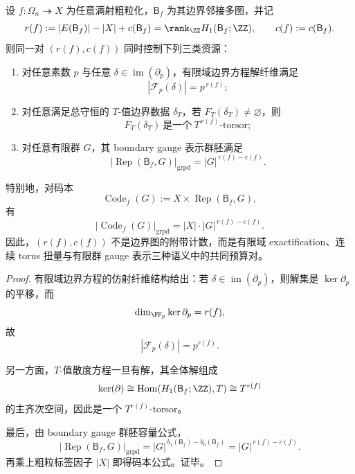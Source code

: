 \begin{theorem}\label{thm:conclusion-boundary-budget-pair-cross-semantic-universality}
设 \(f:\Omega_n\twoheadrightarrow X\) 为任意满射粗粒化，\(\mathsf B_f\) 为其边界邻接多图，并记
\[
r(f):=|E(\mathsf B_f)|-|X|+c(\mathsf B_f)=\rank_{\ZZ}H_1(\mathsf B_f;\ZZ),
\qquad
c(f):=c(\mathsf B_f).
\]
则同一对 \((r(f),c(f))\) 同时控制下列三类资源：
\begin{enumerate}
  \item 对任意素数 \(p\) 与任意 \(\delta\in\operatorname{im}(\partial_p)\)，有限域边界方程解纤维满足
  \[
  |\mathcal F_p(\delta)|=p^{\,r(f)};
  \]
  \item 对任意满足总守恒的 \(T\)-值边界数据 \(\delta_T\)，若 \(F_T(\delta_T)\neq\varnothing\)，则
  \[
  F_T(\delta_T)\ \text{是一个}\ T^{\,r(f)}\text{-torsor};
  \]
  \item 对任意有限群 \(G\)，其 boundary gauge 表示群胚满足
  \[
  |\operatorname{Rep}(\mathsf B_f,G)|_{\mathrm{grpd}}=|G|^{\,r(f)-c(f)}.
  \]
\end{enumerate}
特别地，对码本
\[
\operatorname{Code}_f(G):=X\times \operatorname{Rep}(\mathsf B_f,G),
\]
有
\[
|\operatorname{Code}_f(G)|_{\mathrm{grpd}}=|X|\cdot |G|^{\,r(f)-c(f)}.
\]
因此，\((r(f),c(f))\) 不是边界图的附带计数，而是有限域 exactification、连续 torus 扭量与有限群 gauge 表示三种语义中的共同预算对。
\end{theorem}
\begin{proof}
有限域边界方程的仿射纤维结构给出：若 \(\delta\in\operatorname{im}(\partial_p)\)，则解集是 \(\ker\partial_p\) 的平移，而
\[
\dim_{\FF_p}\ker\partial_p=r(f),
\]
故
\[
|\mathcal F_p(\delta)|=p^{r(f)}.
\]

另一方面，\(T\)-值散度方程一旦有解，其全体解组成
\[
\ker(\partial)\cong \operatorname{Hom}(H_1(\mathsf B_f;\ZZ),T)\cong T^{r(f)}
\]
的主齐次空间，因此是一个 \(T^{r(f)}\)-torsor。

最后，由 boundary gauge 群胚容量公式，
\[
|\operatorname{Rep}(\mathsf B_f,G)|_{\mathrm{grpd}}
=
|G|^{\,b_1(\mathsf B_f)-b_0(\mathsf B_f)}
=
|G|^{\,r(f)-c(f)}.
\]
再乘上粗粒标签因子 \(|X|\) 即得码本公式。证毕。
\end{proof}

